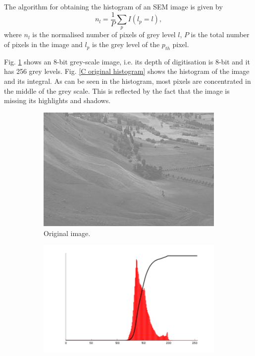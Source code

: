 \documentclass[12pt, conference]{IEEEtran}
\begin{document}
The algorithm for obtaining the histogram of an SEM image is given by
\begin{equation}
    n_l = \frac{1}{P} \sum_{p} I(l_p=l),
\end{equation}
where $n_l$ is the normalised number of pixels of grey level $l$, $P$ is the total number of pixels in the image and $l_p$ is the grey level of the $p_{th}$ pixel. 

Fig. \ref{C original} shows an 8-bit grey-scale image, i.e. its depth of digitisation is 8-bit and it has 256 grey levels. Fig. \ref{C original histogram} shows the histogram of the image and its integral. As can be seen in the histogram, most pixels are concentrated in the middle of the grey scale. This is reflected by the fact that the image is missing its highlights and shadows.

\begin{figure}[htbp]
    \centering
    \begin{subfigure}{0.4\textwidth}
        \centering
        \includegraphics[width=1\textwidth]{Images/C original.jpg}
        \caption{Original image.}
        \label{C original}
    \end{subfigure}
    \begin{subfigure}{0.4\textwidth}
        \centering
        \includegraphics[width=1\textwidth]{Images/C original histogram.png}

\end{subfigure}
\end{figure}
\end{document}
